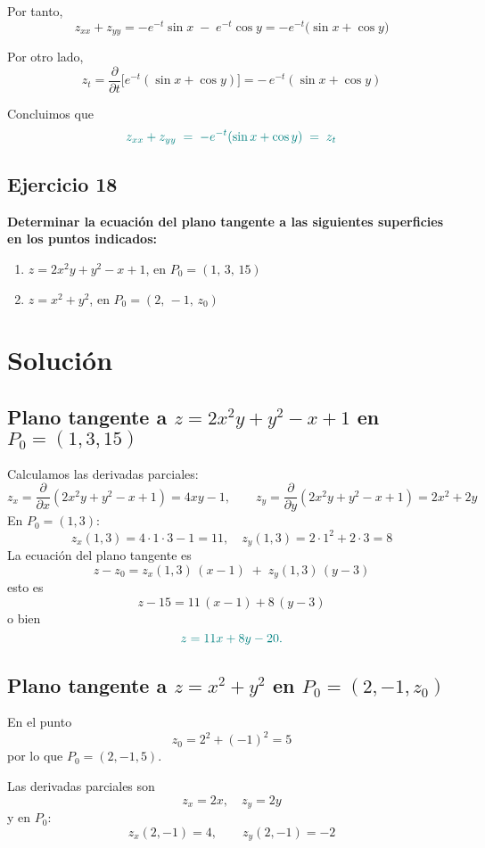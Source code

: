 \documentclass{article}
\begin{document}
Por tanto,
\[
z_{xx}+z_{yy}
=-e^{-t}\sin x \;-\; e^{-t}\cos y
=-e^{-t}\bigl(\sin x+\cos y\bigr)
\]

Por otro lado,
\[
z_t = \frac{\partial}{\partial t}\bigl[e^{-t}(\sin x+\cos y)\bigr]
    = -\,e^{-t}(\sin x+\cos y)
\]

Concluimos que
\[\color{teal}
z_{xx}+z_{yy} \;=\; -e^{-t}(\sin x+\cos y)
           \;=\; z_t
\]



\newpage
\subsection{Ejercicio 18}
\textbf{Determinar la ecuación del plano tangente a las siguientes superficies en los puntos indicados:}
\begin{enumerate}
  \item \(z = 2x^2y + y^2 - x + 1\), en \(P_0 = (1,\,3,\,15)\)
  \item \(z = x^2 + y^2\), en \(P_0 = (2,\,-1,\,z_0)\)
\end{enumerate}


\newpage
\section*{Solución}


\subsection*{Plano tangente a \(z=2x^2y+y^2-x+1\) en \(P_0=(1,3,15)\)}

Calculamos las derivadas parciales:
\[
z_x=\frac{\partial}{\partial x}(2x^2y+y^2-x+1)
=4xy-1,\qquad
z_y=\frac{\partial}{\partial y}(2x^2y+y^2-x+1)
=2x^2+2y
\]
En \(P_0=(1,3)\):
\[
z_x(1,3)=4\cdot1\cdot3-1=11,
\quad
z_y(1,3)=2\cdot1^2+2\cdot3=8
\]
La ecuación del plano tangente es
\[
z - z_0
= z_x(1,3)\,(x-1) \;+\; z_y(1,3)\,(y-3)
\]
esto es
\[
z - 15 = 11\,(x-1) + 8\,(y-3)
\]
o bien
\[\color{teal}
{z = 11x + 8y - 20.}
\]

\subsection*{Plano tangente a \(z = x^2 + y^2\) en \(P_0 = (2,-1,z_0)\)}

En el punto
\[
z_0 = 2^2 + (-1)^2 = 5
\]
por lo que \(P_0=(2,-1,5)\).

Las derivadas parciales son
\[
z_x = 2x,\quad z_y = 2y
\]
y en \(P_0\):
\[
z_x(2,-1) = 4,\qquad z_y(2,-1) = -2
\]
\end{document}
